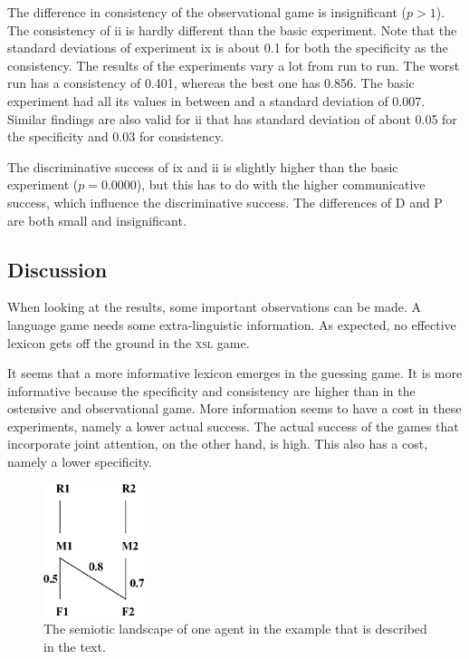 The difference in consistency of the observational game is insignificant ($p>1$). The consistency of {ii} is hardly different than the basic experiment. Note that the standard deviations of experiment {ix} is about 0.1 for both the specificity as the consistency. The results of the experiments vary a lot from run to run. The worst run has a consistency of 0.401, whereas the best one has 0.856. The basic experiment had all its values in between and a standard deviation of 0.007. Similar findings are also valid for {ii} that has standard deviation of about 0.05 for the specificity and 0.03 for consistency.

The discriminative success of {ix} and {ii} is slightly higher than the basic experiment ($p=0.0000$), but this has to do with the higher communicative success, which influence the discriminative success. The differences of D and P are both small and insignificant.

\subsection{Discussion}

When looking at the results, some important observations can be made. A language game needs some extra-linguistic information. As expected, no effective lexicon gets off the ground in the {\scshape xsl} game. 

It seems that a more informative lexicon emerges in the guessing game. It is more informative because the specificity and consistency are higher than in the ostensive and observational game. More information seems to have a cost in these experiments, namely a lower actual success. The actual success of the games that incorporate joint attention, on the other hand, is high. This also has a cost, namely a lower specificity.

\begin{figure}
\centerline{\includegraphics[width=3cm]{feedback/example.eps}}
\caption{The semiotic landscape of one agent in the example that is described in the text.}
\label{f:par:example}
\end{figure}

